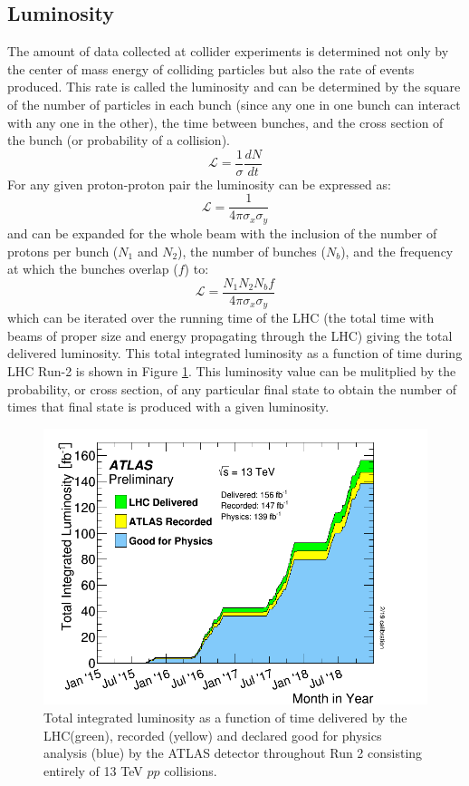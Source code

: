 \subsection{Luminosity}
The amount of data collected at collider experiments is determined not only by the center of mass energy of colliding particles but also the rate of events produced.  This rate is called the luminosity and can be determined by the square of the number of particles in each bunch (since any one in one bunch can interact with any one in the other), the time between bunches, and the cross section of the bunch (or probability of a collision).
\[ \mathcal{L}=\frac{1}{\sigma}\frac{dN}{dt} \]
For any given proton-proton pair the luminosity can be expressed as:
\[ \mathcal{L}=\frac{1}{4\pi \sigma_x \sigma_y} \]
and can be expanded for the whole beam with the inclusion of the number of protons per bunch ($N_1$ and $N_2$), the number of bunches ($N_b$), and the frequency at which the bunches overlap ($f$) to:
\[ \mathcal{L}=\frac{N_1 N_2 N_b f}{4 \pi \sigma_x \sigma_y} \]
which can be iterated over the running time of the LHC (the total time with beams of proper size and energy propagating through the LHC) giving the total delivered luminosity.  This total integrated luminosity as a function of time during LHC Run-2 is shown in Figure \ref{fig:ATLASLumi}.  This luminosity value can be mulitplied by the probability, or cross section, of any particular final state to obtain the number of times that final state is produced with a given luminosity.
\begin{figure}[ht!]
	\centering
	\includegraphics[width=.7\columnwidth]{../ThesisImages/LHCImages/ATLASLumi.png}
	\caption[Total integrated luminosity as a function of time delivered by the LHC(green), recorded (yellow) and declared good for physics analysis (blue) by the ATLAS detector throughout Run 2 consisting entirely of 13 TeV $pp$ collisions.]{Total integrated luminosity as a function of time delivered by the LHC(green), recorded (yellow) and declared good for physics analysis (blue) by the ATLAS detector throughout Run 2 consisting entirely of 13 TeV $pp$ collisions\cite{ATLASLumi}.}
	\label{fig:ATLASLumi}
\end{figure}


